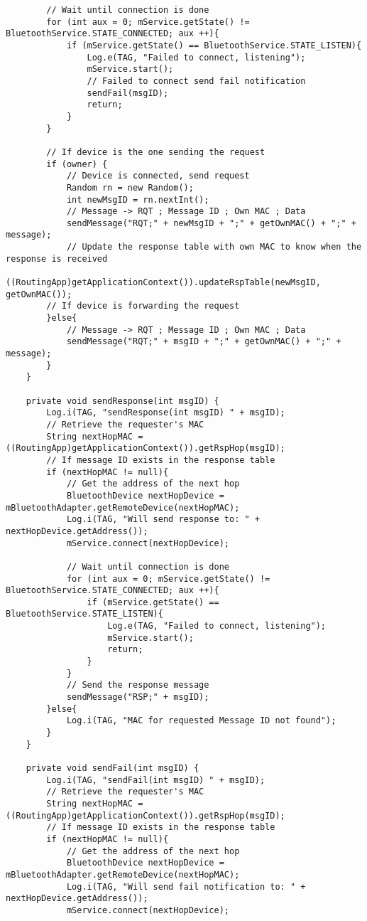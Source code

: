 \begin{verbatim}
        // Wait until connection is done
        for (int aux = 0; mService.getState() != BluetoothService.STATE_CONNECTED; aux ++){
            if (mService.getState() == BluetoothService.STATE_LISTEN){
                Log.e(TAG, "Failed to connect, listening");
                mService.start();
                // Failed to connect send fail notification
                sendFail(msgID);
                return;
            }
        }

        // If device is the one sending the request
        if (owner) {
            // Device is connected, send request
            Random rn = new Random();
            int newMsgID = rn.nextInt();
            // Message -> RQT ; Message ID ; Own MAC ; Data
            sendMessage("RQT;" + newMsgID + ";" + getOwnMAC() + ";" + message);
            // Update the response table with own MAC to know when the response is received
            ((RoutingApp)getApplicationContext()).updateRspTable(newMsgID, getOwnMAC());
        // If device is forwarding the request
        }else{
            // Message -> RQT ; Message ID ; Own MAC ; Data
            sendMessage("RQT;" + msgID + ";" + getOwnMAC() + ";" + message);
        }
    }

    private void sendResponse(int msgID) {
        Log.i(TAG, "sendResponse(int msgID) " + msgID);
        // Retrieve the requester's MAC
        String nextHopMAC = ((RoutingApp)getApplicationContext()).getRspHop(msgID);
        // If message ID exists in the response table
        if (nextHopMAC != null){
            // Get the address of the next hop
            BluetoothDevice nextHopDevice = mBluetoothAdapter.getRemoteDevice(nextHopMAC);
            Log.i(TAG, "Will send response to: " + nextHopDevice.getAddress());
            mService.connect(nextHopDevice);

            // Wait until connection is done
            for (int aux = 0; mService.getState() != BluetoothService.STATE_CONNECTED; aux ++){
                if (mService.getState() == BluetoothService.STATE_LISTEN){
                    Log.e(TAG, "Failed to connect, listening");
                    mService.start();
                    return;
                }
            }
            // Send the response message
            sendMessage("RSP;" + msgID);
        }else{
            Log.i(TAG, "MAC for requested Message ID not found");
        }
    }

    private void sendFail(int msgID) {
        Log.i(TAG, "sendFail(int msgID) " + msgID);
        // Retrieve the requester's MAC
        String nextHopMAC = ((RoutingApp)getApplicationContext()).getRspHop(msgID);
        // If message ID exists in the response table
        if (nextHopMAC != null){
            // Get the address of the next hop
            BluetoothDevice nextHopDevice = mBluetoothAdapter.getRemoteDevice(nextHopMAC);
            Log.i(TAG, "Will send fail notification to: " + nextHopDevice.getAddress());
            mService.connect(nextHopDevice);


\end{verbatim}
